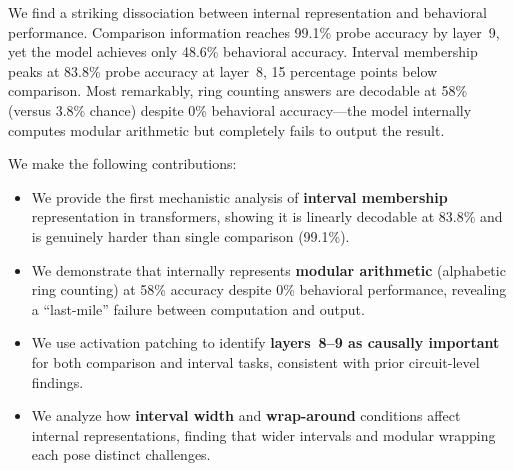  We find a striking dissociation between internal representation and behavioral performance. Comparison information reaches 99.1\% probe accuracy by layer~9, yet the model achieves only 48.6\% behavioral accuracy. Interval membership peaks at 83.8\% probe accuracy at layer~8, 15 percentage points below comparison. Most remarkably, ring counting answers are decodable at 58\% (versus 3.8\% chance) despite 0\% behavioral accuracy---the model internally computes modular arithmetic but completely fails to output the result.

We make the following contributions:
\begin{itemize}[leftmargin=*,itemsep=0pt,topsep=0pt]
    \item We provide the first mechanistic analysis of \textbf{interval membership} representation in transformers, showing it is linearly decodable at 83.8\% and is genuinely harder than single comparison (99.1\%).
    \item We demonstrate that \gptsmall internally represents \textbf{modular arithmetic} (alphabetic ring counting) at 58\% accuracy despite 0\% behavioral performance, revealing a ``last-mile'' failure between computation and output.
    \item We use activation patching to identify \textbf{layers~8--9 as causally important} for both comparison and interval tasks, consistent with prior circuit-level findings.
    \item We analyze how \textbf{interval width} and \textbf{wrap-around} conditions affect internal representations, finding that wider intervals and modular wrapping each pose distinct challenges.
\end{itemize}
